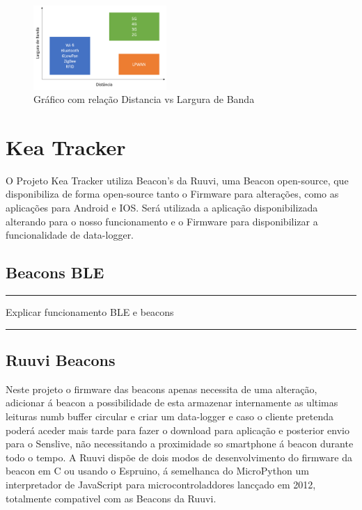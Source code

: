 \begin{figure}[ht]
  \centering
  \includegraphics[width=0.45\textwidth]{images/lpwan.png}
  \caption{Gráfico com relação Distancia vs Largura de Banda\cite{masterthesisLPWAN}}\label{figgraphlpwan}
\end{figure}



\section {Kea Tracker}\label{kea}
O Projeto Kea Tracker utiliza Beacon’s da Ruuvi, uma Beacon open-source\cite{ruuvi}, que disponibiliza de forma open-source tanto o  Firmware para alterações, como as aplicações para Android e IOS. Será utilizada a aplicação disponibilizada alterando para o nosso funcionamento e o Firmware para disponibilizar a funcionalidade de data-logger.
\subsection{Beacons BLE}


{\color{red} \rule{\linewidth}{0.5mm} } 
Explicar funcionamento BLE e beacons\par
{\color{red} \rule{\linewidth}{0.5mm} } 




\subsection{Ruuvi Beacons}
\par Neste projeto o firmware das beacons apenas necessita de uma alteração, adicionar á beacon a possibilidade de esta armazenar internamente as ultimas leituras numb buffer circular e criar um data-logger e caso o cliente pretenda poderá aceder mais tarde para fazer o download para aplicação e posterior envio para o Senslive, não necessitando a proximidade so smartphone á beacon durante todo o tempo. A Ruuvi dispõe de dois modos de desenvolvimento do firmware da beacon em C ou usando o Espruino, á semelhanca do MicroPython um interpretador de JavaScript para microcontroladdores lancçado em 2012, totalmente compativel com as Beacons da Ruuvi.
